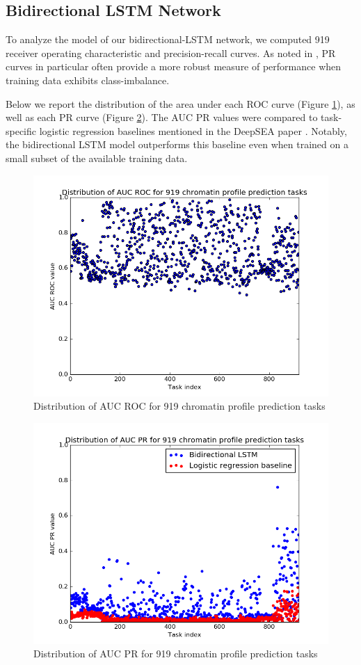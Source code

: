 \documentclass{article}
\begin{document}
\subsection{Bidirectional LSTM Network}
To analyze the model of our bidirectional-LSTM network, we computed 919 receiver operating characteristic and precision-recall curves.  As noted in \cite{quang2016danq}, PR curves in particular often provide a more robust measure of performance when training data exhibits class-imbalance.  

Below we report the distribution of the area under each ROC curve (Figure \ref{fig:rocauc}), as well as each PR curve (Figure \ref{fig:aucpr}).  The AUC PR values were compared to task-specific logistic regression baselines mentioned in the DeepSEA paper \cite{zhou2016deep}.  Notably, the bidirectional LSTM model outperforms this baseline even when trained on a small subset of the available training data.

\begin{figure}[h]
\centering \includegraphics[width=.7\textwidth]{figures/roc_aucs.png}
\caption{Distribution of AUC ROC for 919 chromatin profile prediction tasks}
\label{fig:rocauc}
\end{figure}

\begin{figure}[h]
\centering \includegraphics[width=.7\textwidth]{figures/avg_precs2.png}
\caption{Distribution of AUC PR for 919 chromatin profile prediction tasks}
\label{fig:aucpr}
\end{figure}
\end{document}
